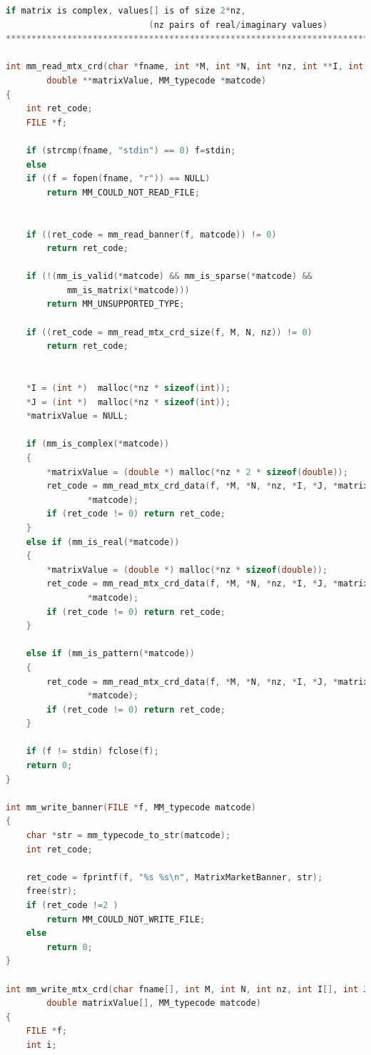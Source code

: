 \documentclass{scrreprt}
\begin{document}
\begin{lstlisting}[language=C++, caption=mmio.cpp]
                        if matrix is complex, values[] is of size 2*nz,
                            (nz pairs of real/imaginary values)
************************************************************************/

int mm_read_mtx_crd(char *fname, int *M, int *N, int *nz, int **I, int **J, 
        double **matrixValue, MM_typecode *matcode)
{
    int ret_code;
    FILE *f;

    if (strcmp(fname, "stdin") == 0) f=stdin;
    else
    if ((f = fopen(fname, "r")) == NULL)
        return MM_COULD_NOT_READ_FILE;


    if ((ret_code = mm_read_banner(f, matcode)) != 0)
        return ret_code;

    if (!(mm_is_valid(*matcode) && mm_is_sparse(*matcode) && 
            mm_is_matrix(*matcode)))
        return MM_UNSUPPORTED_TYPE;

    if ((ret_code = mm_read_mtx_crd_size(f, M, N, nz)) != 0)
        return ret_code;


    *I = (int *)  malloc(*nz * sizeof(int));
    *J = (int *)  malloc(*nz * sizeof(int));
    *matrixValue = NULL;

    if (mm_is_complex(*matcode))
    {
        *matrixValue = (double *) malloc(*nz * 2 * sizeof(double));
        ret_code = mm_read_mtx_crd_data(f, *M, *N, *nz, *I, *J, *matrixValue, 
                *matcode);
        if (ret_code != 0) return ret_code;
    }
    else if (mm_is_real(*matcode))
    {
        *matrixValue = (double *) malloc(*nz * sizeof(double));
        ret_code = mm_read_mtx_crd_data(f, *M, *N, *nz, *I, *J, *matrixValue, 
                *matcode);
        if (ret_code != 0) return ret_code;
    }

    else if (mm_is_pattern(*matcode))
    {
        ret_code = mm_read_mtx_crd_data(f, *M, *N, *nz, *I, *J, *matrixValue, 
                *matcode);
        if (ret_code != 0) return ret_code;
    }

    if (f != stdin) fclose(f);
    return 0;
}

int mm_write_banner(FILE *f, MM_typecode matcode)
{
    char *str = mm_typecode_to_str(matcode);
    int ret_code;

    ret_code = fprintf(f, "%s %s\n", MatrixMarketBanner, str);
    free(str);
    if (ret_code !=2 )
        return MM_COULD_NOT_WRITE_FILE;
    else
        return 0;
}

int mm_write_mtx_crd(char fname[], int M, int N, int nz, int I[], int J[],
        double matrixValue[], MM_typecode matcode)
{
    FILE *f;
    int i;


\end{lstlisting}
\end{document}

